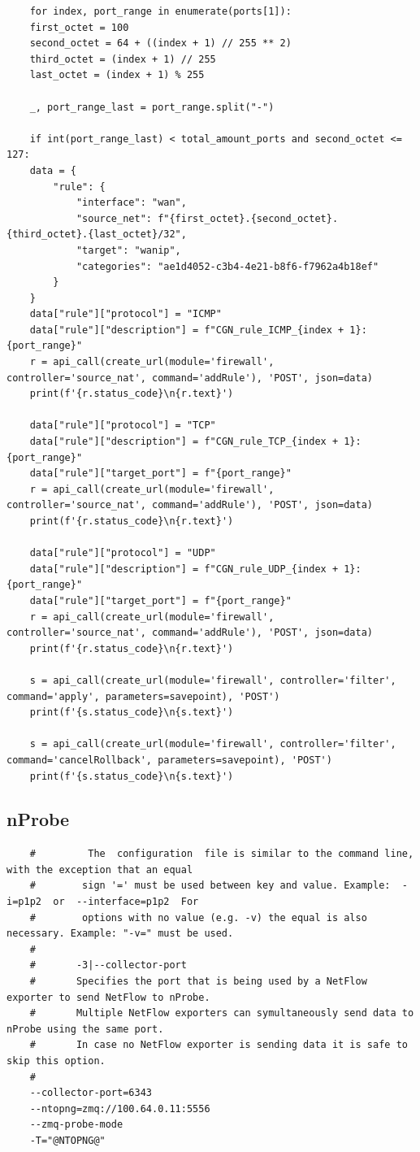 \begin{verbatim}
    for index, port_range in enumerate(ports[1]):
    first_octet = 100
    second_octet = 64 + ((index + 1) // 255 ** 2)
    third_octet = (index + 1) // 255
    last_octet = (index + 1) % 255

    _, port_range_last = port_range.split("-")

    if int(port_range_last) < total_amount_ports and second_octet <= 127:
    data = {
        "rule": {
            "interface": "wan",
            "source_net": f"{first_octet}.{second_octet}.{third_octet}.{last_octet}/32",
            "target": "wanip",
            "categories": "ae1d4052-c3b4-4e21-b8f6-f7962a4b18ef"
        }
    }
    data["rule"]["protocol"] = "ICMP"
    data["rule"]["description"] = f"CGN_rule_ICMP_{index + 1}: {port_range}"
    r = api_call(create_url(module='firewall', controller='source_nat', command='addRule'), 'POST', json=data)
    print(f'{r.status_code}\n{r.text}')

    data["rule"]["protocol"] = "TCP"
    data["rule"]["description"] = f"CGN_rule_TCP_{index + 1}: {port_range}"
    data["rule"]["target_port"] = f"{port_range}"
    r = api_call(create_url(module='firewall', controller='source_nat', command='addRule'), 'POST', json=data)
    print(f'{r.status_code}\n{r.text}')

    data["rule"]["protocol"] = "UDP"
    data["rule"]["description"] = f"CGN_rule_UDP_{index + 1}: {port_range}"
    data["rule"]["target_port"] = f"{port_range}"
    r = api_call(create_url(module='firewall', controller='source_nat', command='addRule'), 'POST', json=data)
    print(f'{r.status_code}\n{r.text}')

    s = api_call(create_url(module='firewall', controller='filter', command='apply', parameters=savepoint), 'POST')
    print(f'{s.status_code}\n{s.text}')

    s = api_call(create_url(module='firewall', controller='filter', command='cancelRollback', parameters=savepoint), 'POST')
    print(f'{s.status_code}\n{s.text}')
\end{verbatim}

\subsection{nProbe}
\begin{verbatim}
    #         The  configuration  file is similar to the command line, with the exception that an equal
    #        sign '=' must be used between key and value. Example:  -i=p1p2  or  --interface=p1p2  For
    #        options with no value (e.g. -v) the equal is also necessary. Example: "-v=" must be used.
    #
    #       -3|--collector-port
    #       Specifies the port that is being used by a NetFlow exporter to send NetFlow to nProbe.
    #       Multiple NetFlow exporters can symultaneously send data to nProbe using the same port.
    #       In case no NetFlow exporter is sending data it is safe to skip this option.
    #
    --collector-port=6343
    --ntopng=zmq://100.64.0.11:5556
    --zmq-probe-mode
    -T="@NTOPNG@"
\end{verbatim}

